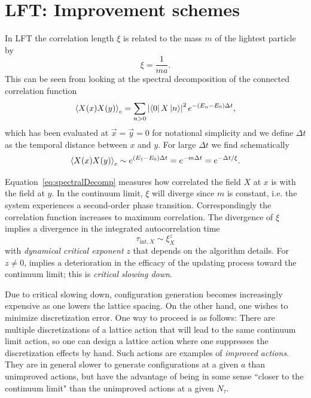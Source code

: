 \chapter{LFT: Improvement schemes}\label{ch:improve}


In LFT the correlation length $\xi$ is related to the mass $m$ of the lightest 
particle by
\begin{equation}
  \xi=\frac{1}{ma}.
\end{equation}
This can be seen from looking at the spectral decomposition of the
connected correlation function
\begin{equation}\label{eq:spectralDecomp}
  \ev{X(x)X(y)}_c=\sum_{n> 0} 
                   \left|\bra{0}X\ket{n}\right|^2
                    e^{-(E_n-E_0)\Delta t},
\end{equation}
which has been evaluated at $\vec{x}=\vec{y}=0$ for notational simplicity and
we define $\Delta t$ as the temporal distance between $x$ and $y$.
For large $\Delta t$ we find schematically
\begin{equation}
  \ev{X(x)X(y)}_c\sim e^{(E_1-E_0)\Delta t} =e^{-m\Delta t}=e^{-\Delta t/\xi}.
\end{equation}

Equation~\eqref{eq:spectralDecomp} measures how correlated the field 
$X$ at $x$ is with the field at $y$. In the continuum limit, $\xi$ will 
diverge since $m$ is constant, i.e. the system experiences a second-order 
phase transition. Correspondingly the correlation function increases to
maximum correlation. The divergence of $\xi$ implies a divergence in the
integrated autocorrelation time
\begin{equation}\label{eq:criticalSlowingDown}
  \tau_{\text{int}, X} \sim \xi_X^z
\end{equation}
with {\it dynamical critical exponent} $z$ that depends on the algorithm 
details. For $z\neq 0$,  implies a
deterioration in the efficacy of the updating process toward the
continuum limit; this is {\it critical slowing down}.

Due to critical slowing down, configuration generation becomes increasingly
expensive as one lowers the lattice spacing.
On the other hand, one wishes to minimize discretization error. One way to
proceed is as follows: There are multiple discretizations of a lattice action
that will lead to the same continuum limit action, so one can design a lattice
action where one suppresses the discretization effects by hand. Such actions
are examples of {\it improved actions}. They are in general slower to generate
configurations at a given $a$ than unimproved actions, but have the advantage
of being in some sense ``closer to the continuum limit" than the unimproved
actions at a given $N_\tau$.

